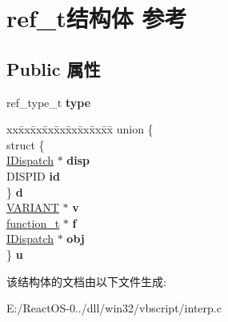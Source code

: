 \hypertarget{structref__t}{}\section{ref\+\_\+t结构体 参考}
\label{structref__t}
\subsection*{Public 属性}
\begin{DoxyCompactItemize}
\item 
\mbox{\label{structref__t_a66006b56d02787c39a5528e1b67e892a}} 
ref\+\_\+type\+\_\+t {\bfseries type}
\item 
\mbox{\label{structref__t_a5e077b75ba9c709430f4090f17231cce}} 
\begin{tabbing}
xx\=xx\=xx\=xx\=xx\=xx\=xx\=xx\=xx\=\kill
union \{\\
\>struct \{\\
\>\>\hyperlink{interface_i_dispatch}{IDispatch} $\ast$ {\bfseries disp}\\
\>\>DISPID {\bfseries id}\\
\>\} {\bfseries d}\\
\>\hyperlink{structtag_v_a_r_i_a_n_t}{VARIANT} $\ast$ {\bfseries v}\\
\>\hyperlink{struct__function__t}{function\_t} $\ast$ {\bfseries f}\\
\>\hyperlink{interface_i_dispatch}{IDispatch} $\ast$ {\bfseries obj}\\
\} {\bfseries u}\\

\end{tabbing}\end{DoxyCompactItemize}


该结构体的文档由以下文件生成\+:\begin{DoxyCompactItemize}
\item 
E\+:/\+React\+O\+S-\/0../dll/win32/vbscript/interp.\+c\end{DoxyCompactItemize}
